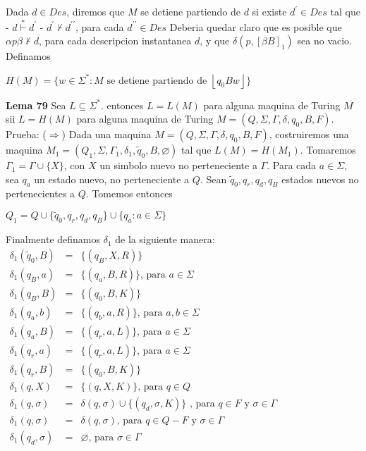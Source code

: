 Dada \(d\in Des\), diremos que \(M\) se detiene partiendo de \(d\) si existe \(d^{\prime }\in Des\) tal que
- \(d\overset{\ast }{\vdash }d^{\prime }\)
- \(d^{\prime }\nvdash d^{\prime \prime }\), para cada \(d^{\prime \prime }\in Des\)
Deberia quedar claro que es posible que \(\alpha p\beta \nvdash d\), para cada descripcion instantanea \(d\), y que \(\delta (p,[\beta B]_{1})\) sea no vacio. Definamos

\(\displaystyle H(M)=\{w\in \Sigma ^{\ast }:M\text{ se detiene partiendo de }\left\lfloor q_{0}Bw\right\rfloor \} \)




\textbf{Lema 79} Sea \(L\subseteq \Sigma ^{\ast }.\) entonces \(L=L(M)\) para alguna maquina de Turing \(M\) sii \(L=H(M)\) para alguna maquina de Turing \(M=(Q,\Sigma ,\Gamma ,\delta ,q_{0},B,F)\).
Prueba: (\(\Rightarrow \)) Dada una maquina \(M=(Q,\Sigma ,\Gamma ,\delta ,q_{0},B,F)\), costruiremos una maquina \(M_{1}=(Q_{1},\Sigma ,\Gamma _{1},\delta _{1}, \tilde{q}_{0},B,\varnothing )\) tal que \(L(M)=H(M_{1}).\) Tomaremos \(\Gamma _{1}=\Gamma \cup \{X\}\), con \(X\) un simbolo nuevo no perteneciente a \(\Gamma \). Para cada \(a\in \Sigma \), sea \(q_{a}\) un estado nuevo, no perteneciente a \(Q.\) Sean \(\tilde{q}_{0},q_{r},q_{d},q_{B}\) estados nuevos no pertenecientes a \(Q.\) Tomemos entonces

\(\displaystyle Q_{1}=Q\cup \{\tilde{q}_{0},q_{r},q_{d},q_{B}\}\cup \{q_{a}:a\in \Sigma \} \)

Finalmente definamos \(\delta _{1}\) de la siguiente manera:
\(\displaystyle \begin{array}{rcl} \delta _{1}(\tilde{q}_{0},B) & =& \{(q_{B},X,R)\} \\ \delta _{1}(q_{B},a) & =& \{(q_{a},B,R)\}\text{, para }a\in \Sigma \\ \delta _{1}(q_{B},B) & =& \{(q_{0},B,K)\} \\ \delta _{1}(q_{a},b) & =& \{(q_{b},a,R)\}\text{, para }a,b\in \Sigma \\ \delta _{1}(q_{a},B) & =& \{(q_{r},a,L)\}\text{, para }a\in \Sigma \\ \delta _{1}(q_{r},a) & =& \{(q_{r},a,L)\}\text{, para }a\in \Sigma \\ \delta _{1}(q_{r},B) & =& \{(q_{0},B,K)\} \\ \delta _{1}(q,X) & =& \{(q,X,K)\}\text{, para }q\in Q \\ \delta _{1}(q,\sigma ) & =& \delta (q,\sigma )\cup \{(q_{d},\sigma ,K)\}\text{ , para }q\in F\text{ y }\sigma \in \Gamma \\ \delta _{1}(q,\sigma ) & =& \delta (q,\sigma )\text{, para }q\in Q-F\text{ y } \sigma \in \Gamma \\ \delta _{1}(q_{d},\sigma ) & =& \varnothing \text{, para }\sigma \in \Gamma \end{array} \)

